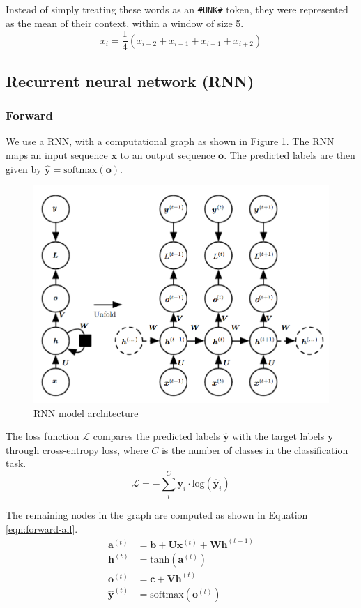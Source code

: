 \documentclass{article}
\numberwithin{equation}{section}
\begin{document}
Instead of simply treating these words as an \lstinline{#UNK#} token, they were represented as the mean of their context, within a window of size 5.
	$$ x_i = \frac{1}{4}(x_{i-2} + x_{i-1} + x_{i+1} + x_{i+2}) $$

\subsection{Recurrent neural network (RNN)}
\subsubsection{Forward}
We use a RNN, with a computational graph as shown in Figure \ref{fig:rnn}. The RNN maps an input sequence $\bm{x}$ to an output sequence $\bm{o}$. The predicted labels are then given by $\hat{\bm{y}} = \text{softmax}(\bm{o})$.\\

\begin{figure}[h!]
	\centering
	\includegraphics[width=0.7\linewidth]{assets/rnn.png}
	\caption{RNN model architecture \cite{Goodfellow-et-al-2016}}
	\label{fig:rnn}
\end{figure}

The loss function $\mathcal{L}$ compares the predicted labels $\hat{\bm{y}}$ with the target labels $\bm{y}$ through cross-entropy loss, where $C$ is the number of classes in the classification task.
	$$ \mathcal{L} = -\sum_i^C \bm{y}_i \cdot \text{log}(\hat{\bm{y}}_i) $$

The remaining nodes in the graph are computed as shown in Equation \ref{eqn:forward-all}.
\begin{equation}
\label{eqn:forward-all}
\begin{split}
	\bm{a}^{(t)} &= \bm{b} + \bm{U}\bm{x}^{(t)} + \bm{W}\bm{h}^{(t-1)} \\
	\bm{h}^{(t)} &= \text{tanh}(\bm{a}^{(t)}) \\
	\bm{o}^{(t)} &= \bm{c} + \bm{V}\bm{h}^{(t)} \\
	\hat{\bm{y}}^{(t)} &= \text{softmax}(\bm{o}^{(t)})
\end{split}
\end{equation}
\end{document}
